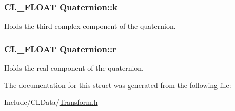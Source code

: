 \subsubsection[{\texorpdfstring{k}{k}}]{\setlength{\rightskip}{0pt plus 5cm}C\+L\+\_\+\+F\+L\+O\+AT Quaternion\+::k}\hypertarget{struct_quaternion_afcd8190c91b99d7b267860a6aa2c5bce}{}\label{struct_quaternion_afcd8190c91b99d7b267860a6aa2c5bce}
Holds the third complex component of the quaternion. 
\subsubsection[{\texorpdfstring{r}{r}}]{\setlength{\rightskip}{0pt plus 5cm}C\+L\+\_\+\+F\+L\+O\+AT Quaternion\+::r}\hypertarget{struct_quaternion_ae01fc1079dd08eb5d439540e1af277e7}{}\label{struct_quaternion_ae01fc1079dd08eb5d439540e1af277e7}
Holds the real component of the quaternion. 

The documentation for this struct was generated from the following file\+:\begin{DoxyCompactItemize}
\item 
Include/\+C\+L\+Data/\hyperlink{_transform_8h}{Transform.\+h}\end{DoxyCompactItemize}

